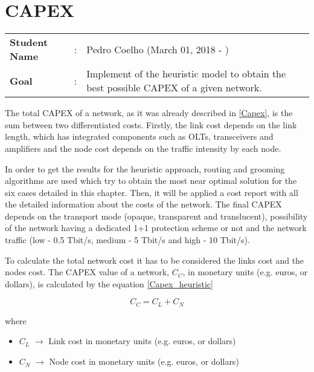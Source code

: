 \clearpage

\section{CAPEX}\label{Heuristic_CAPEX}
\begin{tcolorbox}	
\begin{tabular}{p{2.75cm} p{0.2cm} p{10.5cm}} 	
\textbf{Student Name}  &:& Pedro Coelho    (March 01, 2018 - )\\
\textbf{Goal}          &:& Implement of the heuristic model to obtain the best possible CAPEX of a given network.
\end{tabular}
\end{tcolorbox}
\vspace{11pt}

The total CAPEX of a network, as it was already described in \ref{Capex}, is the sum between two differentiated costs. Firstly, the link cost depends on the link length, which has integrated components such as OLTs, transceivers and amplifiers and the node cost depends on the traffic intensity by each node.

In order to get the results for the heuristic approach, routing and grooming algorithms are used which try to obtain the most near optimal solution for the six cases detailed in this chapter. Then, it will be applied a cost report with all the detailed information about the costs of the network. The final CAPEX depends on the transport mode (opaque, transparent and translucent), possibility of the network having a dedicated 1+1 protection scheme or not and the network traffic (low - 0.5 Tbit/s, medium - 5 Tbit/s and high - 10 Tbit/s).

To calculate the total network cost it has to be considered the links cost and the nodes cost. The CAPEX value of a network, $C_C$, in monetary units (e.g. euros, or dollars), is calculated by the equation \ref{Capex_heuristic}

\begin{equation}
C_C = C_L + C_N
\label{Capex_heuristic}
\end{equation}

\noindent
where

\begin{itemize}
\item{$C_L$				$\rightarrow$	Link cost in monetary units (e.g. euros, or dollars)}
\item{$C_N$				$\rightarrow$	Node cost in monetary units (e.g. euros, or dollars)}
\end{itemize}

